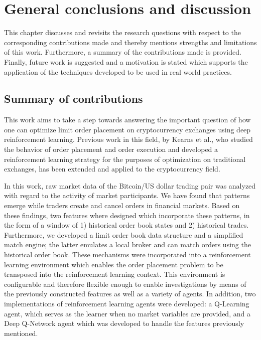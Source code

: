 \chapter{General conclusions and discussion}
\label{chap:discussion}

This chapter discusses and revisits the research questions with respect to the corresponding contributions made and thereby mentions strengths and limitations of this work.
Furthermore, a summary of the contributions made is provided.
Finally, future work is suggested and a motivation is stated which supports the application of the techniques developed to be used in real world practices.

\section{Summary of contributions}

This work aims to take a step towards answering the important question of how one can optimize limit order placement on cryptocurrency exchanges using deep reinforcement learning.
Previous work in this field, by Kearns et al., who studied the behavior of order placement and order execution\cite{nevmyvaka2005electronic} and developed a reinforcement learning strategy\cite{nevmyvaka2006reinforcement} for the purposes of optimization on traditional exchanges, has been extended and applied to the cryptocurrency field.

In this work, raw market data of the Bitcoin/US dollar trading pair was analyzed with regard to the activity of market participants.
We have found that patterns emerge while traders create and cancel orders in financial markets.
Based on these findings, two features where designed which incorporate these patterns, in the form of a window of 1) historical order book states and 2) historical trades.
Furthermore, we developed a limit order book data structure and a simplified match engine; the latter emulates a local broker and can match orders using the historical order book.
These mechanisms were incorporated into a reinforcement learning environment which enables the order placement problem to be transposed into the reinforcement learning context.
This environment is configurable and therefore flexible enough to enable investigations by means of the previously constructed features as well as a variety of agents.
In addition, two implementations of reinforcement learning agents were developed: a Q-Learning agent, which serves as the learner when no market variables are provided, and a Deep Q-Network agent which was developed to handle the features previously mentioned.

